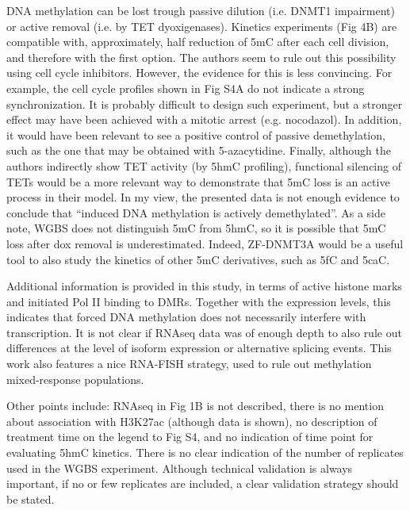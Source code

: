 \documentclass[10pt]{article}
\begin{document}
DNA methylation can be lost trough passive dilution (i.e. DNMT1
impairment) or active removal (i.e. by TET dyoxigenases). Kinetics
experiments (Fig 4B) are compatible with, approximately, half reduction
of 5mC after each cell division, and therefore with the first option.
The authors seem to rule out this possibility using cell cycle
inhibitors. However, the evidence for this is less convincing. For
example, the cell cycle profiles shown in Fig S4A do not indicate a
strong synchronization. It is probably difficult to design such
experiment, but a stronger effect may have been achieved with a mitotic
arrest (e.g. nocodazol). In addition, it would have been relevant to see
a positive control of passive demethylation, such as the one that may be
obtained with 5-azacytidine. Finally, although the authors indirectly
show TET activity (by 5hmC profiling), functional silencing of TETs
would be a more relevant way to demonstrate that 5mC loss is an active
process in their model. In my view, the presented data is not enough
evidence to conclude that ``induced DNA methylation is actively
demethylated''. As a side note, WGBS does not distinguish 5mC from 5hmC,
so it is possible that 5mC loss after dox removal is underestimated.
Indeed, ZF-DNMT3A would be a useful tool to also study the kinetics of
other 5mC derivatives, such as 5fC and 5caC.

\par\null

Additional information is provided in this study, in terms of active
histone marks and initiated Pol II binding to DMRs. Together with the
expression levels, this indicates that forced DNA methylation does not
necessarily interfere with transcription. It is not clear if RNAseq data
was of enough depth to also rule out differences at the level of isoform
expression or alternative splicing events. This work also features a
nice RNA-FISH strategy, used to rule out methylation mixed-response
populations.

\par\null

Other points include: RNAseq in Fig 1B is not described, there is no
mention about association with H3K27ac (although data is shown), no
description of treatment time on the legend to Fig S4, and no indication
of time point for evaluating 5hmC kinetics. There is no clear indication
of the number of replicates used in the WGBS experiment. Although
technical validation is always important, if no or few replicates are
included, a clear validation strategy should be stated.~
\end{document}
